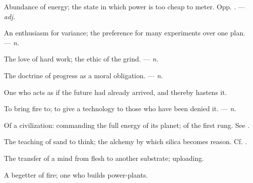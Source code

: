 Abundance of energy; the state in which power is too cheap to meter. Opp. . ---  \textit{adj.}

 An enthusiasm for variance; the preference for many experiments over one plan. ---  \textit{n.}

 The love of hard work; the ethic of the grind. ---  \textit{n.}

 The doctrine of progress as a moral obligation. ---  \textit{n.}

 One who acts as if the future had already arrived, and thereby hastens it.

 To bring fire to; to give a technology to those who have been denied it. ---  \textit{n.}

 Of a civilization: commanding the full energy of its planet; of the first rung. See .

 The teaching of sand to think; the alchemy by which silica becomes reason. Cf. .

 The transfer of a mind from flesh to another substrate; uploading.

 A begetter of fire; one who builds power-plants.
